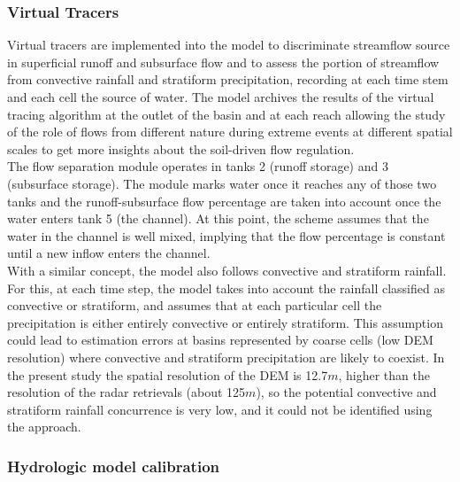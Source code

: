 \documentclass[hess, manuscript]{copernicus}
\begin{document}
\subsubsection{Virtual Tracers}

Virtual tracers are implemented into the model to discriminate streamflow source in superficial runoff and subsurface flow and to assess the portion of streamflow from convective rainfall and stratiform precipitation, recording at each time stem and each cell the source of water.  The model archives the results of the virtual tracing algorithm at the outlet of the basin and at each reach allowing the study of the role of flows from different nature during extreme events at different spatial scales to get more insights about the soil-driven flow regulation. \\

The flow separation module operates in tanks 2 (runoff storage) and 3 (subsurface storage).  The module marks water once it reaches any of those two tanks and the runoff-subsurface flow percentage are taken into account once the water enters tank 5 (the channel).   At this point, the scheme assumes that the water in the channel is well mixed,  implying that the flow percentage is constant until a new inflow enters the channel.\\

With a similar concept, the model also follows convective and stratiform rainfall.  For this, at each time step, the model takes into account the rainfall classified as convective or stratiform, and assumes that at each particular cell the precipitation is either entirely convective or entirely stratiform. This assumption could lead to estimation errors at basins represented by coarse cells (low DEM resolution) where convective and stratiform precipitation are likely to coexist. In the present study the spatial resolution of the DEM is 12.7$m$, higher than the resolution of the radar retrievals (about 125$m$), so the potential convective and stratiform rainfall concurrence is very low, and it could not be identified using the \cite{Steiner1995} approach.\\

\subsubsection{Hydrologic model calibration}
\end{document}
